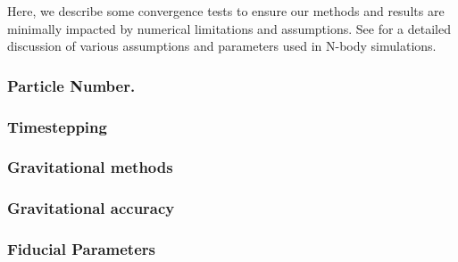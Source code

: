 Here, we describe some convergence tests to ensure our methods and
results are minimally impacted by numerical limitations and assumptions.
See \citet{power2003} for a detailed discussion of various assumptions
and parameters used in N-body simulations.

\subsubsection{Particle Number.}\label{particle-number.}

\subsubsection{Timestepping}\label{timestepping}

\subsubsection{Gravitational methods}\label{gravitational-methods}

\subsubsection{Gravitational accuracy}\label{gravitational-accuracy}

\subsubsection{Fiducial Parameters}\label{fiducial-parameters}

